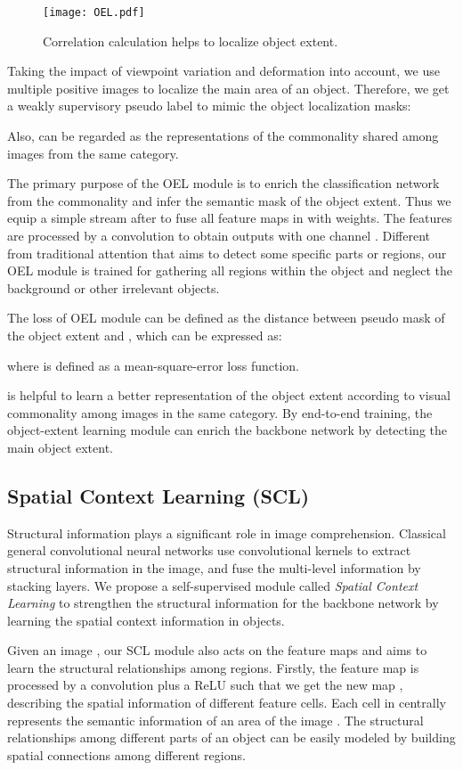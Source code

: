 \documentclass[10pt,twocolumn,letterpaper]{article}
\begin{document}
\begin{figure}[!ht]
    \centering
    \texttt{[image: OEL.pdf]}
    \caption{Correlation calculation helps to localize object extent.} 
    \label{fig:wcm_illustrate}
\end{figure}

Taking the impact of viewpoint variation and deformation into account, we use multiple positive images to localize the main area of an object. Therefore, we get a weakly supervisory pseudo label to mimic the object localization masks:

Also,  can be regarded as the representations of the commonality shared among images from the same category. 

The primary purpose of the OEL module is to enrich the classification network from the commonality and infer the semantic mask of the object extent. Thus we equip a simple stream after  to fuse all feature maps in  with weights. The features are processed by a  convolution to obtain outputs with one channel . Different from traditional attention that aims to detect some specific parts or regions, our OEL module is trained for gathering all regions within the object and neglect the background or other irrelevant objects. 

The loss of OEL module  can be defined as the distance between pseudo mask  of the object extent and , which can be expressed as:


where  is defined as a mean-square-error loss function.

 is helpful to learn a better representation of the object extent according to visual commonality among images in the same category.
By end-to-end training, the object-extent learning module can enrich the backbone network by detecting the main object extent.

\subsection{Spatial Context Learning (SCL)}
Structural information plays a significant role in image comprehension. Classical general convolutional neural networks use convolutional kernels to extract structural information in the image, and fuse the multi-level information by stacking layers. We propose a self-supervised module called \textit{Spatial Context Learning} to strengthen the structural information for the backbone network by learning the spatial context information in objects. 

Given an image , our SCL module also acts on the feature maps  and aims to learn the structural relationships among regions. Firstly, the feature map is processed by a  convolution plus a ReLU such that we get the new map , describing the spatial information of different feature cells. Each cell in  centrally represents the semantic information of an area of the image . The structural relationships among different parts of an object can be easily modeled by building spatial connections among different regions.
\end{document}
